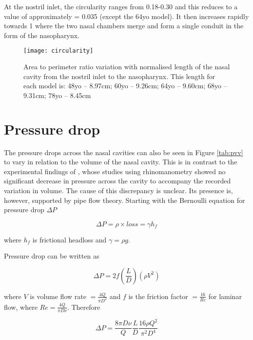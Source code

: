 At the nostril inlet, the circularity ranges from 0.18-0.30 and this reduces to a value of approximately = 0.035 (except the 64yo model). It then increases rapidly towards 1 where the two nasal chambers merge and form a single conduit in the form of the nasopharynx.







\begin{figure}
\centering
\texttt{[image: circularity]}
\caption{Area to perimeter ratio variation with normalised length of the nasal cavity from the nostril inlet to the nasopharynx. This length for each model is: 48yo – 8.97cm; 60yo – 9.26cm; 64yo – 9.60cm; 68yo – 9.31cm; 78yo – 8.45cm}
\label{fig:Circ}
\end{figure}

\section{Pressure drop}

The pressure drops across the nasal cavities can also be seen in Figure \ref{tab:pvv} to vary in relation to the volume of the nasal cavity. This is in contrast to the experimental findings of \cite{Lindemann2008, Edelstein1996, WhanKim2007}, whose studies using rhinomanometry showed no significant decrease in pressure across the cavity to accompany the recorded variation in volume. The cause of this discrepancy is unclear. Its presence is, however, supported by pipe flow theory.
Starting with the Bernoulli equation for pressure drop $\Delta P$ 

\begin{equation}
  \Delta P = \rho \times loss = \gamma h_f
\end{equation}

  where $h_f$ is frictional headloss and $\gamma = \rho g$.


Pressure drop can be written as

\begin{equation} \label{eq:1}
  \Delta P = 2f(\frac{L}{D})(\rho V^2)
\end{equation}

where $V$ is volume flow rate $= \frac{4Q}{\pi D^2}$ and $f$ is the friction factor $=\frac{16}{Re}$ for laminar flow, where $Re = \frac{4Q}{\pi D \nu}$. Therefore

\begin{equation}
  \Delta P = \frac{8\pi D \nu}{Q}\frac{L}{D}\frac{16\rho Q^2}{\pi^2D^4}
\end{equation}

